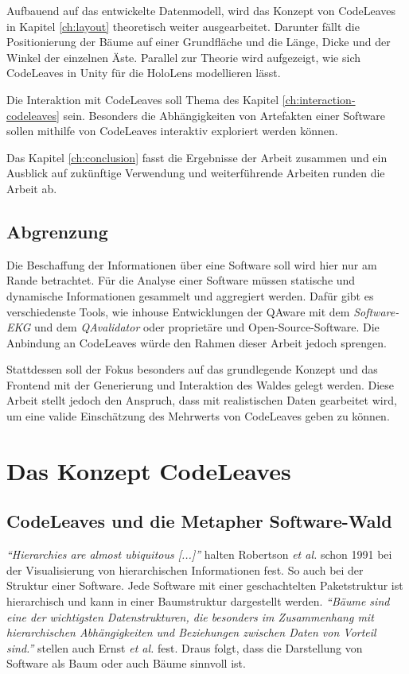 Aufbauend auf das entwickelte Datenmodell, wird das Konzept von CodeLeaves in Kapitel \ref{ch:layout} theoretisch weiter ausgearbeitet. Darunter fällt die Positionierung der Bäume auf einer Grundfläche und die Länge, Dicke und der Winkel der einzelnen Äste. Parallel zur Theorie wird aufgezeigt, wie sich CodeLeaves in Unity für die HoloLens modellieren lässt.

Die Interaktion mit CodeLeaves soll Thema des Kapitel \ref{ch:interaction-codeleaves} sein. Besonders die Abhängigkeiten von Artefakten einer Software sollen mithilfe von CodeLeaves interaktiv exploriert werden können.

Das Kapitel \ref{ch:conclusion} fasst die Ergebnisse der Arbeit zusammen und ein Ausblick auf zukünftige Verwendung und weiterführende Arbeiten runden die Arbeit ab.

\section{Abgrenzung}
\label{sec:distinction}

Die Beschaffung der Informationen über eine Software soll wird hier nur am Rande betrachtet. Für die Analyse einer Software müssen statische und dynamische Informationen gesammelt und aggregiert werden. Dafür gibt es verschiedenste Tools, wie inhouse Entwicklungen der QAware mit dem \textit{Software-EKG} und dem \textit{QAvalidator} oder proprietäre und Open-Source-Software. Die Anbindung an CodeLeaves würde den Rahmen dieser Arbeit jedoch sprengen.

Stattdessen soll der Fokus besonders auf das grundlegende Konzept und das Frontend mit der Generierung und Interaktion des Waldes gelegt werden. Diese Arbeit stellt jedoch den Anspruch, dass mit realistischen Daten gearbeitet wird, um eine valide Einschätzung des Mehrwerts von CodeLeaves geben zu können.

\chapter{Das Konzept CodeLeaves}
\label{ch:concept}

\section{CodeLeaves und die Metapher Software-Wald}
\label{sec:idea}

\emph{``Hierarchies are almost ubiquitous [...]''} \cite{robertson1991cone} halten Robertson \emph{et al.}
 schon 1991 bei der Visualisierung von hierarchischen Informationen fest. So auch bei der Struktur einer Software. Jede Software mit einer geschachtelten Paketstruktur ist hierarchisch und kann in einer Baumstruktur dargestellt werden. \emph{"`Bäume sind eine der wichtigsten Datenstrukturen, die besonders im Zusammenhang mit hierarchischen Abhängigkeiten und Beziehungen zwischen Daten von Vorteil sind."'} \cite{ernst2016grundkurs} stellen auch Ernst \emph{et al.} fest. Draus folgt, dass die Darstellung von Software als Baum oder auch Bäume sinnvoll ist.

